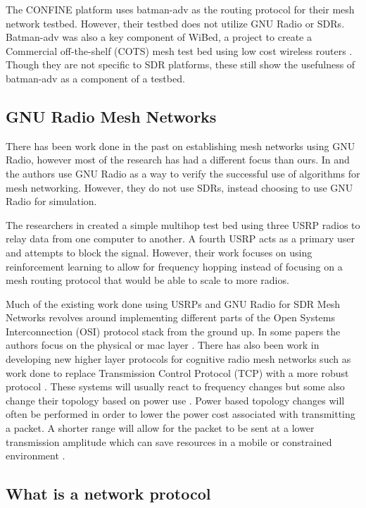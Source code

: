 The CONFINE platform \cite{0001} uses batman-adv as the routing protocol for their mesh network testbed. However, their testbed does not utilize GNU Radio or SDRs\cite{0001}. Batman-adv was also a key component of WiBed, a project to create a Commercial off-the-shelf (COTS) mesh test bed using low cost wireless routers \cite{6686492} \cite{6962154}. Though they are not specific to SDR platforms, these still show the usefulness of batman-adv as a component of a testbed. 

\subsection{GNU Radio Mesh Networks}

There has been work done in the past on establishing mesh networks using GNU Radio, however most of the research has had a different focus than ours. In \cite{4509617} and \cite{5062250} the authors use GNU Radio as a way to verify the successful use of algorithms for mesh networking. However, they do not use SDRs, instead choosing to use GNU Radio for simulation. 

The researchers in \cite{7141228} created a simple multihop test bed using three USRP radios to relay data from one computer to another. A fourth USRP acts as a primary user and attempts to block the signal. However, their work focuses on using reinforcement learning to allow for frequency hopping instead of focusing on a mesh routing protocol that would be able to scale to more radios. 

Much of the existing work done using USRPs and GNU Radio for SDR Mesh Networks revolves around implementing different parts of the Open Systems Interconnection (OSI) protocol stack from the ground up. In some papers the authors focus on the physical or mac layer \cite{5508221}. There has also been work in developing new higher layer protocols for cognitive radio mesh networks such as work done to replace Transmission Control Protocol (TCP) with a more robust protocol \cite{6686523}. These systems will usually react to frequency changes but some also change their topology based on power use \cite{6983150}. Power based topology changes will often be performed in order to lower the power cost associated with transmitting a packet. A shorter range will allow for the packet to be sent at a lower transmission amplitude which can save resources in a mobile or constrained environment \cite{6983150}.

\subsection{What is a network protocol}

